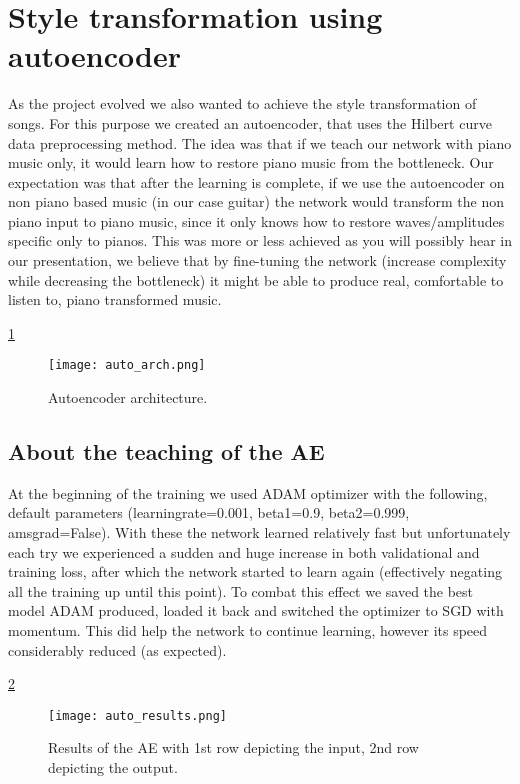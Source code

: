 \section{Style transformation using autoencoder}
As the project evolved we also wanted to achieve the style transformation of songs. For this purpose we created an autoencoder, that uses the Hilbert curve data preprocessing method. The idea was that if we teach our network with piano music only, it would learn how to restore piano music from the bottleneck. Our expectation was that after the learning is complete, if we use the autoencoder on non piano based music (in our case guitar) the network would transform the non piano input to piano music, since it only knows how to restore waves/amplitudes specific only to pianos. This was more or less achieved as you will possibly hear in our presentation, we believe that by fine-tuning the network (increase complexity while decreasing the bottleneck) it might be able to produce real, comfortable to listen to, piano transformed music.

\ref{fig:auto}
\begin{figure}[H]
	\centering
	\texttt{[image: auto\_arch.png]}
	\caption{Autoencoder architecture.}
	\label{fig:auto}
\end{figure}

\subsection{About the teaching of the AE}
At the beginning of the training we used ADAM optimizer with the following, default parameters (learningrate=0.001, beta1=0.9, beta2=0.999, amsgrad=False). With these the network learned relatively fast but unfortunately each try we experienced a sudden and huge increase in both validational and training loss, after which the network started to learn again (effectively negating all the training up until this point). To combat this effect we saved the best model ADAM produced, loaded it back and switched the optimizer to SGD with momentum. This did help the network to continue learning, however its speed considerably reduced (as expected).

\ref{fig:autores}
\begin{figure}[H]
	\centering
	\texttt{[image: auto\_results.png]}
	\caption{Results of the AE with 1st row depicting the input, 2nd row depicting the output.}
	\label{fig:autores}
\end{figure}